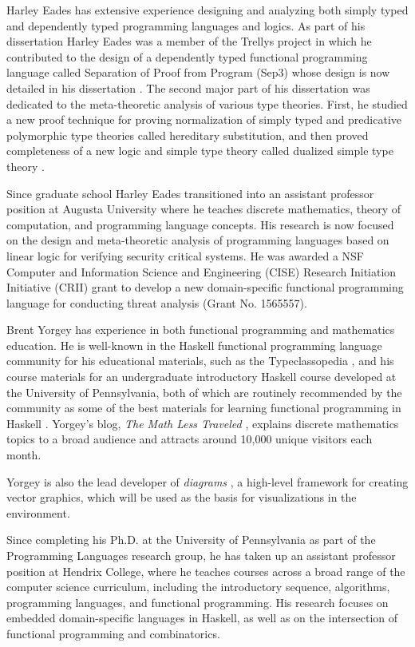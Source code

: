 Harley Eades has extensive experience designing and analyzing both
simply typed and dependently typed programming languages and
logics. As part of his dissertation Harley Eades was a member of the
Trellys project \citep{Kimmel:2013,Sjoberg:2012} in which he
contributed to the design of a dependently typed functional
programming language called Separation of Proof from Program (Sep3)
whose design is now detailed in his dissertation
\citep{Eades:2014b,Kimmel:2013}. The second major part of his
dissertation was dedicated to the meta-theoretic analysis of various
type theories. First, he studied a new proof technique for proving
normalization of simply typed and predicative polymorphic type
theories called hereditary substitution, and then proved completeness
of a new logic and simple type theory called dualized simple type
theory \citep{Eades:2014b}.

Since graduate school Harley Eades transitioned into an assistant
professor position at Augusta University where he teaches discrete
mathematics, theory of computation, and programming language
concepts. His research is now focused on the design and meta-theoretic
analysis of programming languages based on linear logic for verifying
security critical systems.  He was awarded a NSF Computer and
Information Science and Engineering (CISE) Research Initiation
Initiative (CRII) grant to develop a new domain-specific functional
programming language for conducting threat analysis (Grant
No. 1565557).

Brent Yorgey has experience in both functional programming and
mathematics education.  He is well-known in the Haskell functional
programming language community for his educational materials, such as
the Typeclassopedia \citep{Typeclassopedia}, and his course
materials for an undergraduate introductory Haskell course developed
at the University of Pennsylvania, both of which are routinely
recommended by the community as some of the best materials for
learning functional programming in Haskell \citep{bitemyapp-learn}.
Yorgey's blog, \emph{The Math Less Traveled} \citep{yorgey-tmlt},
explains discrete mathematics topics to a broad audience and attracts
around 10,000 unique visitors each month.

Yorgey is also the lead developer
of \emph{diagrams} \citep{diagrams-web, diagrams-FARM}, a
high-level framework for creating vector graphics, which will be used
as the basis for visualizations in the \thelang environment.

Since completing his Ph.D. at the University of Pennsylvania as part
of the Programming Languages research group, he has taken up an
assistant professor position at Hendrix College, where he teaches
courses across a broad range of the computer science curriculum,
including the introductory sequence, algorithms, programming
languages, and functional programming.  His research focuses on
embedded domain-specific languages in Haskell, as well as on the
intersection of functional programming and combinatorics.
